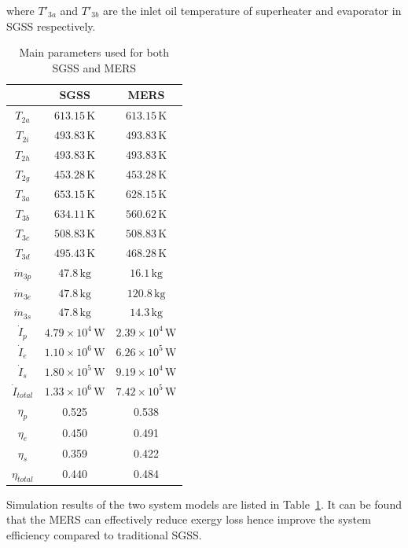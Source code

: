 where $T'_{3a}$ and $T'_{3b}$ are the inlet oil temperature of superheater and evaporator in SGSS respectively.
\begin{table}[htbp]
	\caption{Main parameters used for both SGSS and MERS}
	\begin{center}
	\begin{tabular}{ccc}
		\toprule
		&    SGSS	&	MERS\\
		\midrule
		$T_{2a}$	&	$613.15\,\mathrm{K}$	&	$613.15\,\mathrm{K}$\\
		$T_{2i}$	&	$493.83\,\mathrm{K}$	&	$493.83\,\mathrm{K}$\\
		$T_{2h}$	&	$493.83\,\mathrm{K}$	&	$493.83\,\mathrm{K}$\\
		$T_{2g}$	&	$453.28\,\mathrm{K}$	&	$453.28\,\mathrm{K}$\\
		$T_{3a}$	&	$653.15\,\mathrm{K}$	&	$628.15\,\mathrm{K}$\\
		$T_{3b}$	&	$634.11\,\mathrm{K}$	&	$560.62\,\mathrm{K}$\\
		$T_{3c}$	&	$508.83\,\mathrm{K}$	&	$508.83\,\mathrm{K}$\\
		$T_{3d}$	&	$495.43\,\mathrm{K}$	&	$468.28\,\mathrm{K}$\\
		$\dot{m}_{3p}$	&	$47.8\,\mathrm{kg}$	&	$16.1\,\mathrm{kg}$\\
		$\dot{m}_{3e}$	&	$47.8\,\mathrm{kg}$	&	$120.8\,\mathrm{kg}$\\
		$\dot{m}_{3s}$	&	$47.8\,\mathrm{kg}$	&	$14.3\,\mathrm{kg}$\\
		$\dot{I}_p$    &    $4.79\times 10^4\,\mathrm{W}$    &    $2.39\times 10^4\,\mathrm{W}$\\
		$\dot{I}_e$    &    $1.10\times 10^6\,\mathrm{W}$    &    $6.26\times 10^5\,\mathrm{W}$\\
		$\dot{I}_s$    &    $1.80\times 10^5\,\mathrm{W}$    &    $9.19\times 10^4\,\mathrm{W}$\\
		$\dot{I}_{total}$    &    $1.33\times 10^6\,\mathrm{W}$    &    $7.42\times 10^5\,\mathrm{W}$\\
		$\eta_p$    &    0.525    &    0.538\\
		$\eta_e$    &    0.450    &    0.491\\
		$\eta_s$    &    0.359    &    0.422\\
		$\eta_{total}$    &    0.440    &    0.484\\
		\bottomrule
	\end{tabular}
	\end{center}
	\label{tab:comparison}
\end{table}
Simulation results of the two system models are listed in Table~\ref{tab:comparison}. It can be found that the MERS can effectively reduce exergy loss hence improve the system efficiency compared to traditional SGSS.

